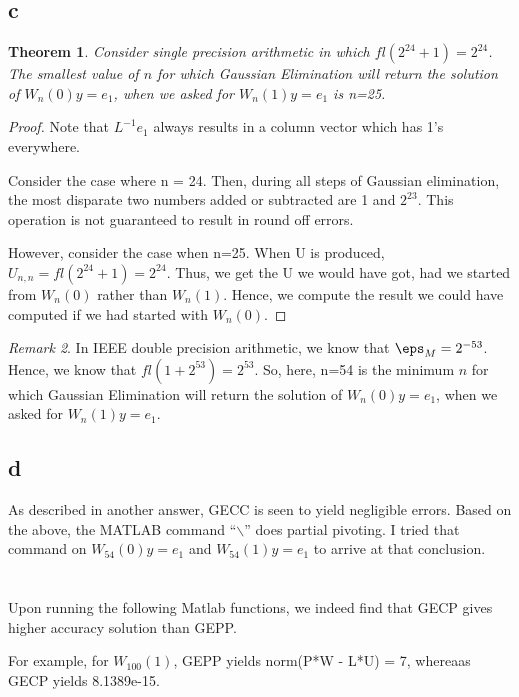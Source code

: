 \documentclass[10pt]{amsart}
\newtheorem{thm}{Theorem}[subsection]
\theoremstyle{remark}
\newtheorem{rem}[thm]{Remark}
\begin{document}
\subsection{c}
\begin{thm}
Consider single precision arithmetic in which $fl(2^{24} + 1) = 2^{24}$.  The smallest value of $n$ for which Gaussian Elimination will return the solution of $W_{n}(0) y = e_{1}$,  when we asked for $W_{n}(1) y = e_{1}$ is n=25.

\end{thm}
\begin{proof}
Note that $L^{-1} e_{1}$ always results in a column vector which has 1's everywhere.

Consider the case where n = 24. Then, during all steps of Gaussian elimination, the most disparate two numbers added or subtracted are 1 and $2^{23}$. This operation is not guaranteed to result in round off errors.

However, consider the case when n=25. When U is produced, $U_{n,n} = fl(2^{24} + 1) = 2^{24}$. Thus, we get the U we would have got, had we started from $W_{n}(0)$ rather than $W_{n}(1)$. Hence, we compute the result we could have computed if we had started with $W_{n}(0)$.
\end{proof}

\begin{rem}
In IEEE double precision arithmetic, we know that $\eps_{M} = 2^{-53}$. Hence, we know that $fl(1+ 2^{53}) = 2^{53}$. So, here, n=54 is the minimum $n$ for which Gaussian Elimination will return the solution of $W_{n}(0) y = e_{1}$,  when we asked for $W_{n}(1) y = e_{1}$.
\end{rem}

\subsection{d}
As described in another answer, GECC is seen to yield negligible errors. Based on the above, the MATLAB command ``$\backslash$'' does partial pivoting. I tried that command on $W_{54}(0) y = e_{1}$ and $W_{54}(1) y = e_{1}$ to arrive at that conclusion.

\section{}
Upon running the following Matlab functions, we indeed find that GECP gives higher accuracy solution than GEPP.

For example, for $W_{100}(1)$, GEPP yields norm(P*W - L*U) = 7, whereaas GECP yields 8.1389e-15. 




\end{document}
